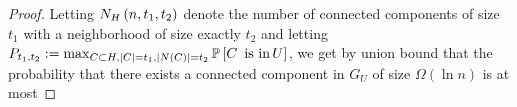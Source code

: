 \begin{proof}


    Letting $N_{H}\left(n,t_1,t_2\right)$ denote the number of connected components of size $t_1$ with a neighborhood of size exactly $t_2$ and letting $P_{t_1,t_2}:=\max_{C\subset H,\left\lvert C\right\rvert=t_1,\left\lvert N\left(C\right)\right\rvert=t_2}\operatorname*{\mathbb{P}}\left[\text{\ensuremath{C}\,\ is in\,\ensuremath{U}}\right]$, we get by union bound that the probability that there exists a connected component in $G_{U}$ of size $\Omega(\ln n)$ is at most



    

\end{proof}
